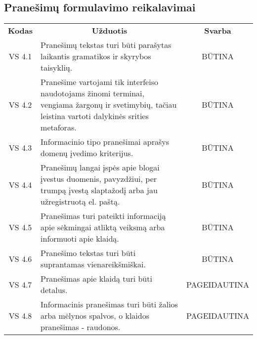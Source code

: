 \documentclass{VUMIFPSkursinis}
\begin{document}
\subsection{Pranešimų formulavimo reikalavimai}
\begin{center}
	\begin{table}[H]
	\begin{tabular}{|p{2cm}|p{11cm}|p{2cm}|}
	\hline
	    \rowcolor{lightgray}
	    \multicolumn{3}{|c|}{Pranešimų formulavimo reikalavimai}\\
	\hline
		\multicolumn{1}{|c|}{{\bfseries Kodas}}&
		\multicolumn{1}{|c|}{ {\bfseries Užduotis}}&
		\multicolumn{1}{|c|}{{\bfseries Svarba}}\\		
	\hline
		\multicolumn{1}{|c|}{VS 4.1}&
		\multicolumn{1}{|p{12,6cm}|}{Pranešimų tekstas turi būti parašytas laikantis gramatikos ir skyrybos taisyklių.}& 
		\multicolumn{1}{|c|}{BŪTINA}\\
	\hline
		\multicolumn{1}{|c|}{VS 4.2}&
		\multicolumn{1}{|p{12,5cm}|}{Pranešime vartojami tik interfeiso naudotojams žinomi terminai, vengiama žargonų ir svetimybių, tačiau leistina vartoti dalykinės srities metaforas.}& 
		\multicolumn{1}{|c|}{BŪTINA}\\
	\hline
		\multicolumn{1}{|c|}{VS 4.3}&
		\multicolumn{1}{|p{12,5cm}|}{Informacinio tipo pranešimai aprašys domenų įvedimo kriterijus.}& 
		\multicolumn{1}{|c|}{BŪTINA}\\
	\hline
		\multicolumn{1}{|c|}{VS 4.4}&
		\multicolumn{1}{|p{12,5cm}|}{Pranešimų langai įspės apie blogai įvestus duomenis, pavyzdžiui, per trumpą įvestą slaptažodį arba jau užregistruotą el. paštą.}& 
		\multicolumn{1}{|c|}{BŪTINA}\\
	\hline
		\multicolumn{1}{|c|}{VS 4.5}&
		\multicolumn{1}{|p{12,5cm}|}{Pranešimas turi pateikti informaciją apie sėkmingai atliktą veiksmą arba informuoti apie klaidą.}& 
		\multicolumn{1}{|c|}{BŪTINA}\\
	\hline
		\multicolumn{1}{|c|}{VS 4.6}&
		\multicolumn{1}{|p{12,5cm}|}{Pranešimo tekstas turi būti suprantamas vienareikšmiškai.}& 
		\multicolumn{1}{|c|}{BŪTINA}\\
	\hline
		\multicolumn{1}{|c|}{VS 4.7}&
		\multicolumn{1}{|p{12,5cm}|}{Pranešimas apie klaidą turi būti detalus.}& 
		\multicolumn{1}{|p{1.5cm}|}{PAGEIDAUTINA}\\
	\hline
		\multicolumn{1}{|c|}{VS 4.8}&
		\multicolumn{1}{|p{12,5cm}|}{Informacinis pranešimas turi būti žalios arba mėlynos spalvos, o klaidos pranešimas - raudonos.}& 
		\multicolumn{1}{|p{1.5cm}|}{PAGEIDAUTINA}\\

\end{tabular}
\end{table}
\end{center}
\end{document}
